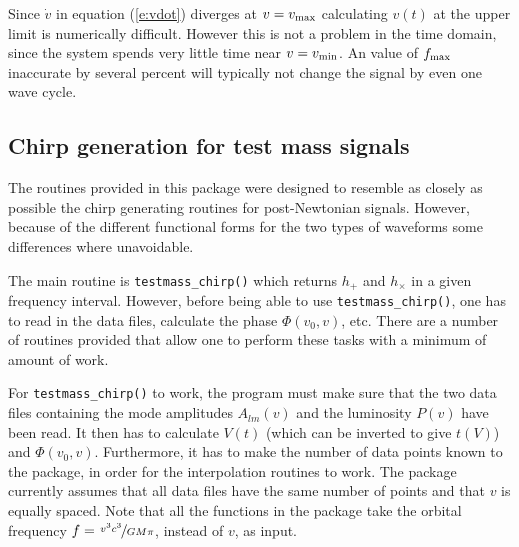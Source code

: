 Since $\dot{v}$ in equation (\ref{e:vdot}) diverges at $v=v_{\rm 
max}$ calculating $v(t)$ at the upper limit is numerically difficult. 
However this is not a problem in the time domain, since the system spends very little time near $v =
v_{\rm min}$. An value 
of $f_{\rm max}$ inaccurate by several percent will typically not change 
the signal by  even one wave cycle. 

\subsection{Chirp generation for test mass signals}

The routines provided in this package were designed to resemble as 
closely as possible the chirp generating routines for post-Newtonian 
signals. However, because of the different functional forms for  the two 
types of waveforms some differences where unavoidable.

The main routine is {\tt testmass\_chirp()} which returns
$h_+$ and $h_\times$ in a given frequency 
interval. However, before being able to use {\tt testmass\_chirp()}, one 
has to read in the data files, calculate the phase $\Phi(v_0,v)$, etc.
There are a number of routines provided that allow one to perform
these tasks with a minimum of amount of work.

For {\tt testmass\_chirp()} to work, the program must make sure that the
two data files containing the mode amplitudes $A_{lm}(v)$ and the luminosity $P(v)$
have been read. It then has to calculate 
$V(t)$ (which can be inverted to give $t(V)$) and 
$\Phi(v_0,v)$. Furthermore, it has to make the number of data points
known to the package, in order for the interpolation routines
to work. The package currently assumes that all data files have the same
number of points and that $v$ is equally spaced. 
Note that all the functions in the package take the orbital frequency 
$f= \nicefrac{v^3 c^3}{G M \pi}$, instead of $v$, as input. 
\clearpage
%
%

